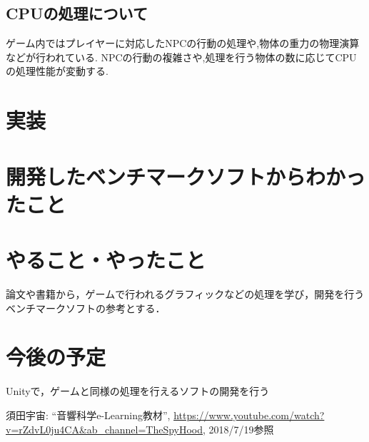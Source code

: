 \documentclass[twocolumn,10pt,a4j]{ltjsarticle}
\begin{document}
  \subsection{CPUの処理について}
  ゲーム内ではプレイヤーに対応したNPCの行動の処理や,物体の重力の物理演算などが行われている.
  NPCの行動の複雑さや,処理を行う物体の数に応じてCPUの処理性能が変動する.

\section{実装}


\section{開発したベンチマークソフトからわかったこと}

\section{やること・やったこと}

論文や書籍から，ゲームで行われるグラフィックなどの処理を学び，開発を行うベンチマークソフトの参考とする．


\section{今後の予定}
Unityで，ゲームと同様の処理を行えるソフトの開発を行う

\begin{thebibliography}{99}
 須田宇宙: ``音響科学e-Learning教材'', \url{https://www.youtube.com/watch?v=rZdvL0ju4CA&ab_channel=TheSpyHood}, 2018/7/19参照
\end{thebibliography}
\end{document}
